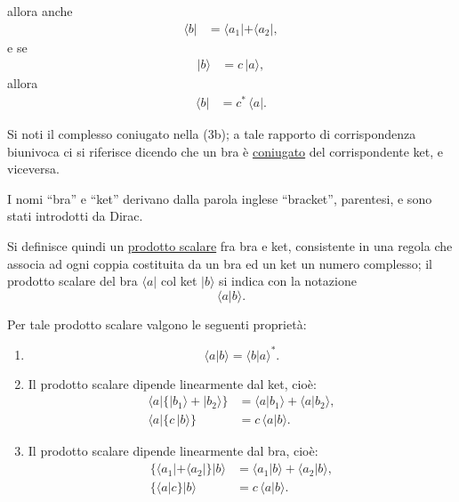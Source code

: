 \documentclass[11pt, a4paper]{book}
\numberwithin{equation}{section}
\begin{document}

allora anche
\begin{align}
\langle b| &= \langle a_1| + \langle a_2|, \tag{2b}
\end{align}
e se
\begin{align}
|b\rangle &= c\,|a\rangle, \tag{3a}
\end{align}
allora
\begin{align}
\langle b| &= c^*\,\langle a|. \tag{3b}
\end{align}

Si noti il complesso coniugato nella (3b); a tale rapporto di
corrispondenza biunivoca ci si riferisce dicendo che un bra è
\underline{coniugato} del corrispondente ket, e viceversa.

I nomi ``bra'' e ``ket'' derivano dalla parola inglese ``bracket'',
parentesi, e sono stati introdotti da Dirac.

Si definisce quindi un \underline{prodotto scalare} fra bra e ket,
consistente in una regola che associa ad ogni coppia costituita da un
bra ed un ket un numero complesso; il prodotto scalare del bra $\langle
a|$ col ket $|b\rangle$ si indica con la notazione
\[
\langle a | b \rangle.
\]

Per tale prodotto scalare valgono le seguenti proprietà:
\begin{enumerate}
  \item
    \begin{equation}
    \langle a | b \rangle = \langle b | a \rangle^*.
    \end{equation}
  \item Il prodotto scalare dipende linearmente dal ket, cioè:
    \begin{align}
    \langle a|\bigl\{|b_1\rangle+|b_2\rangle\bigr\}
      &= \langle a|b_1\rangle + \langle a|b_2\rangle, \tag{5a} \\
    \langle a|\bigl\{c\,|b\rangle\bigr\}
      &= c\,\langle a|b\rangle. \tag{5b}
    \end{align}
  \item Il prodotto scalare dipende linearmente dal bra, cioè:
    \begin{align}
    \bigl\{\langle a_1|+\langle a_2|\bigr\}|b\rangle
      &= \langle a_1|b\rangle+\langle a_2|b\rangle, \tag{6a} \\
    \bigl\{\langle a|c\bigr\}|b\rangle
      &= c\,\langle a|b\rangle. \tag{6b}
    \end{align}
\end{enumerate}
\end{document}
